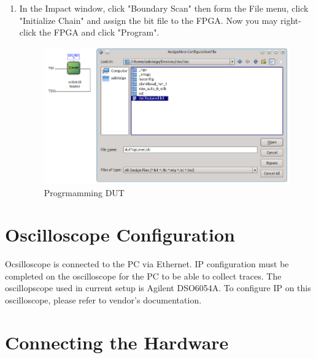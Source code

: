 \begin{enumerate}
\begin{figure}
\begin{center}
		\caption{\label{fig:dut-run-impact}}
		\end{center}
		\vspace{-3ex}
		\end{figure}
  \item In the Impact window, click "Boundary Scan" then form the File menu, click "Initialize Chain" and assign the bit file to the FPGA. Now you may right-click the FPGA and click "Program".
		\begin{figure} 
		\begin{center}
		\includegraphics[scale=0.6]{figures/dut-program}
		\caption{\label{fig:dut-program}Progrmamming DUT}
		\end{center}
		\vspace{-3ex}
		\end{figure}
  \end{enumerate}


\section{Oscilloscope Configuration}
Ocsilloscope is connected to the PC via Ethernet. IP configuration must be completed on the oscilloscope for the PC to be able to collect traces. 
The oscillopscope used in current setup is Agilent DSO6054A. To configure IP on this oscilloscope, please refer to vendor's documentation.

\section{Connecting the Hardware}

